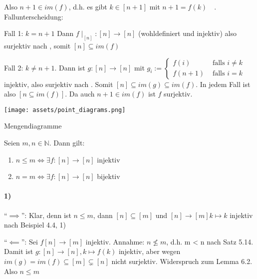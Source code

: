 \documentclass{../../meta/tudscript}
\begin{document}
Also \(n+1 \in im(f)\), d.h. es gibt \(k \in [n+1]\) mit
\(n+1 = f(k)\quad\). Fallunterscheidung:

Fall 1: \(k = n+1\) Dann \(f\mid_[n]: [n] \rightarrow [n]\)
(wohldefiniert und injektiv) also surjektiv nach , somit
\([n] \subseteq im(f)\)

Fall 2: \(k \neq n + 1\). Dann ist \(g:[n] \rightarrow [n]\) mit
\(g_i:= \begin{cases} f(i) & \text{ falls } i \neq k \\ f(n+1) & \text{ falls } i = k \end{cases}\)
injektiv, also surjektiv nach . Somit
\([n] \subseteq im(g) \subseteq im(f)\). In jedem Fall ist also
\([n \subseteq im(f)]\). Da auch \(n + 1 \in im(f)\) ist \(f\)
surjektiv.


\texttt{[image: assets/point\_diagrams.png]}
\caption{Mengendiagramme}



Seien \(m,n \in \mathbb{N}\). Dann gilt:

\begin{enumerate}
\def\labelenumi{\arabic{enumi})}

\item
  \(n \leq m \iff \exists f: [n] \rightarrow [n]\) injektiv
\item
  \(n = m \iff \exists f: [n] \rightarrow [n]\) bijektiv
\end{enumerate}


\paragraph{1)}

``\(\implies\)'': Klar, denn ist \(n \leq m\), dann
\([n] \subseteq [m]\) und \([n] \rightarrow[m] k \mapsto k\) injektiv
nach Beispiel 4.4, 1)

``\(\impliedby\)'': Sei \(f[n] \rightarrow[m]\) injektiv. Annahme:
\(n \not\leq m\), d.h. m \textless{} n nach Satz 5.14. Damit ist
\(g:[n] \rightarrow[n], k \mapsto f(k)\) injektiv, aber wegen
\(im(g) = im(f) \subseteq [m] \subsetneq [n]\) nicht surjektiv.
Widerspruch zum Lemma 6.2. Also \(n \leq m\)
\begin{tikz}
\end{tikz}
\end{document}
